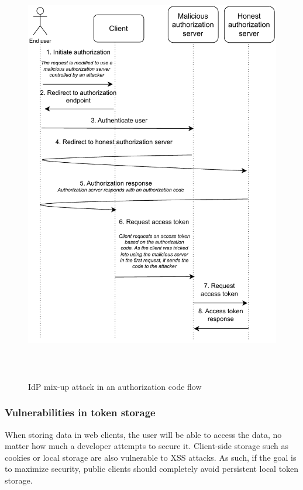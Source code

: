 \begin{figure}[b]
	\centering
    \includegraphics[height=185mm]{assets/idp_mix_up.drawio.pdf}
	\caption{IdP mix-up attack in an authorization code flow}
	\label{idp_mix_up}
\end{figure}

\subsubsection{Vulnerabilities in token storage}
When storing data in web clients, the user will be able to access the data, no matter how much a developer attempts to secure it.
Client-side storage such as cookies or local storage are also vulnerable to XSS attacks.
As such, if the goal is to maximize security, public clients should completely avoid persistent local token storage.

